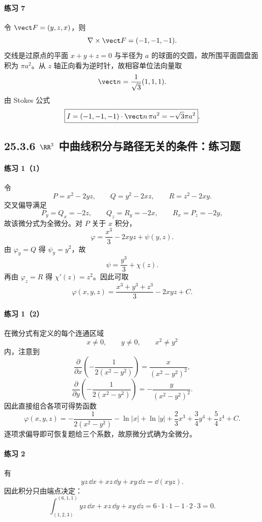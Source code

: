 \paragraph{练习 7}
\begin{xsolution}
令 $\vect F=(y,z,x)$，则
\[
  \nabla\times\vect F=(-1,-1,-1).
\]
交线是过原点的平面 $x+y+z=0$ 与半径为 $a$ 的球面的交圆，故所围平面圆盘面积为 $\pi a^2$。从 $z$ 轴正向看为逆时针，故相容单位法向量取
\[
  \vect n=\frac1{\sqrt3}(1,1,1).
\]
由 Stokes 公式
\[
  \boxed{I=(-1,-1,-1)\cdot\vect n\,\pi a^2=-\sqrt3\pi a^2}.
\]
\end{xsolution}

\subsection*{25.3.6 $\RR^3$ 中曲线积分与路径无关的条件：练习题}

\paragraph{练习 1（1）}
\begin{xsolution}
令
\[
  P=x^2-2yz,\qquad Q=y^2-2xz,\qquad R=z^2-2xy.
\]
交叉偏导满足
\[
  P_y=Q_x=-2z,\qquad Q_z=R_y=-2x,\qquad R_x=P_z=-2y,
\]
故该微分式为全微分。对 $P$ 关于 $x$ 积分，
\[
  \varphi=\frac{x^3}{3}-2xyz+\psi(y,z).
\]
由 $\varphi_y=Q$ 得 $\psi_y=y^2$，故
\[
  \psi=\frac{y^3}{3}+\chi(z).
\]
再由 $\varphi_z=R$ 得 $\chi'(z)=z^2$。因此可取
\[
  \boxed{\varphi(x,y,z)=\frac{x^3+y^3+z^3}{3}-2xyz+C}.
\]
\end{xsolution}

\paragraph{练习 1（2）}
\begin{xsolution}
在微分式有定义的每个连通区域
\[
  x\ne0,\qquad y\ne0,\qquad x^2\ne y^2
\]
内，注意到
\[
  \frac{\partial}{\partial x}\left(-\frac1{2(x^2-y^2)}\right)
  =\frac{x}{(x^2-y^2)^2},
\]
\[
  \frac{\partial}{\partial y}\left(-\frac1{2(x^2-y^2)}\right)
  =-\frac{y}{(x^2-y^2)^2}.
\]
因此直接组合各项可得势函数
\[
\boxed{
\varphi(x,y,z)
=-\frac1{2(x^2-y^2)}-\ln|x|+\ln|y|
+\frac23x^3+\frac34y^4+\frac54z^4+C}.
\]
逐项求偏导即可恢复题给三个系数，故原微分式确为全微分。
\end{xsolution}

\paragraph{练习 2}
\begin{xsolution}
有
\[
  yz\,\dd x+xz\,\dd y+xy\,\dd z=\dd(xyz).
\]
因此积分只由端点决定：
\[
  \int_{(1,2,3)}^{(6,1,1)}yz\,\dd x+xz\,\dd y+xy\,\dd z
  =6\cdot1\cdot1-1\cdot2\cdot3=0.
\]
\end{xsolution}

